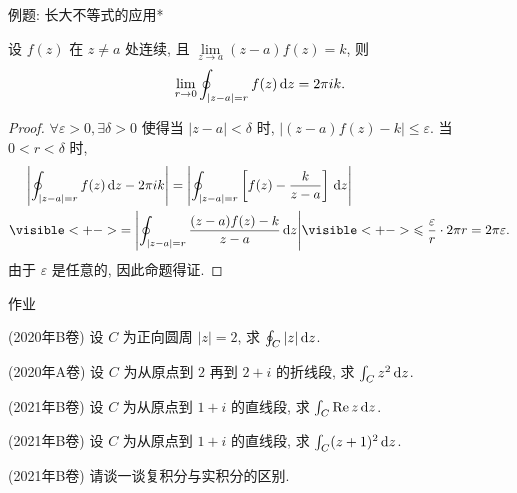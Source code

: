 \begin{frame}{例题: 长大不等式的应用*}
\beqskip{2pt}
\begin{example}
设 $f(z)$ 在 $z\neq a$ 处连续, 且 $\lim\limits_{z\to a}(z-a)f(z)=k$, 则
\[\lim
_{r\to0}\oint_{|z-a|=r}f(z)\,\mathrm{d} z=2\pi ik.\]
\end{example}
\begin{proof}
$\forall \varepsilon>0,\exists\delta>0$ 使得当 $|z-a|<\delta$ 时, $|(z-a)f(z)-k|\le\varepsilon$.
\onslide<+->
当 $0<r<\delta$ 时,
\begin{align*}
&\peq\abs{\oint_{|z-a|=r}f(z)\diff z-2\pi i k}
=\abs{\oint_{|z-a|=r}\left[f(z)-\frac k{z-a}\right]\diff z}\\
&\visible<+->{=\abs{\oint_{|z-a|=r}\frac{(z-a)f(z)-k}{z-a}\diff z}}
\visible<+->{\le \frac{\varepsilon}r\cdot 2\pi r=2\pi\varepsilon.}
\end{align*}
\onslide<+->
由于 $\varepsilon$ 是任意的, 因此命题得证.
\end{proof}
\endgroup
\end{frame}


{
\homework
\begin{frame}[<*>]{作业}
  \begin{homeworks}
		\item(2020年B卷) 设 $C$ 为正向圆周 $|z|=2$, 求 $\oint_C|z|\,\mathrm{d} z$.
		\item(2020年A卷) 设 $C$ 为从原点到 $2$ 再到 $2+i$ 的折线段, 求 $\int_Cz^2\,\mathrm{d} z$.
		\item(2021年B卷) 设 $C$ 为从原点到 $1+i$ 的直线段, 求 $\int_C \operatorname{Re} z\,\mathrm{d} z$.
		\item(2021年B卷) 设 $C$ 为从原点到 $1+i$ 的直线段, 求 $\int_C(z+1)^2\,\mathrm{d} z$.
		\item(2021年B卷) 请谈一谈复积分与实积分的区别.
  \end{homeworks}
\end{frame}
}